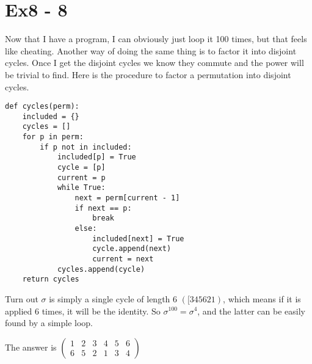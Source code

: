 \section*{Ex8 - 8}
Now that I have a program, I can obviously just loop it 100 times, but that feels like cheating. Another way of doing the same thing is to factor it into disjoint cycles. Once I get the disjoint cycles we know they commute and the power will be trivial to find. Here is the procedure to factor a permutation into disjoint cycles.

\begin{verbatim}
def cycles(perm):
    included = {}
    cycles = []
    for p in perm:
        if p not in included:
            included[p] = True
            cycle = [p]
            current = p
            while True:
                next = perm[current - 1]
                if next == p:
                    break
                else:
                    included[next] = True
                    cycle.append(next)
                    current = next
            cycles.append(cycle)
    return cycles
\end{verbatim}

Turn out $ \sigma $ is simply a single cycle of length 6 $ ([3 4 5 6 2 1) $, which means if it is applied 6 times, it will be the identity. So $ \sigma^{100} = \sigma^4 $, and the latter can be easily found by a simple loop.

The answer is $ \left(\begin{array}{cccccc}1 & 2 & 3 & 4 & 5 & 6\\6 & 5 & 2 & 1 & 3 & 4\end{array}\right) $